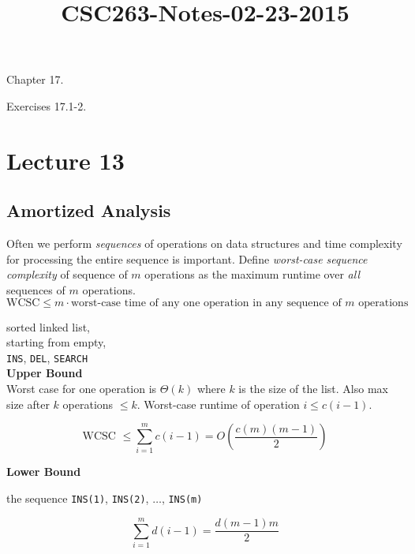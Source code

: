 



\title{CSC263-Notes-02-23-2015}



\reversemarginpar
\mpreadings

\noindent Chapter 17. \\

\mpselftest

\noindent Exercises 17.1-2.

\section*{Lecture 13}

\subsection*{Amortized Analysis}

\noindent Often we perform \textit{sequences} of operations on data structures and time complexity for processing the entire sequence is important. Define \textit{worst-case sequence complexity} of sequence of $m$ operations as the maximum runtime over \textit{all} sequences of $m$ operations.
$$ \textrm{WCSC} \leq m \cdot \textrm{worst-case time of any one operation in any sequence of } m \textrm{ operations}$$

\reversemarginpar
{}

\noindent sorted linked list, \\
starting from empty, \\
\texttt{INS}, \texttt{DEL}, \texttt{SEARCH} \\

\noindent \textbf{Upper Bound} \\

\noindent Worst case for one operation is $\Theta(k)$ where $k$ is the size of the list. Also max size after $k$ operations $\leq k$. Worst-case runtime of operation $i \leq c(i-1)$.

$$\textrm{WCSC } \leq \sum_{i=1}^m c(i-1) = O \left ( \frac{c(m)(m-1)}{2} \right ) $$

\noindent \textbf{Lower Bound} \\

\mpconsider

\noindent the sequence \texttt{INS(1)}, \texttt{INS(2)}, $\ldots$, \texttt{INS(m)}

$$ \sum_{i=1}^{m} d(i-1) = \frac{d(m-1)m}{2} $$

